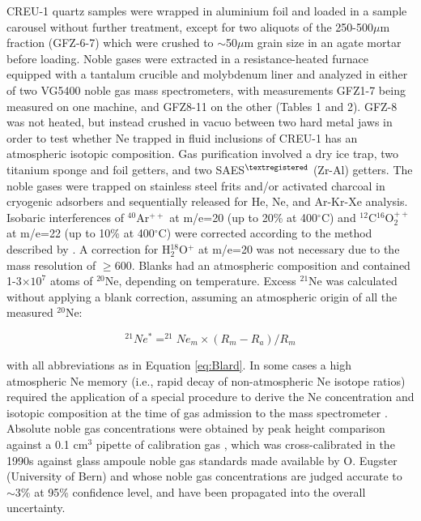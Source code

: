 \documentclass[authoryear,review,12pt]{elsarticle}
\begin{document}
CREU-1 quartz samples were wrapped in aluminium foil and loaded in a
sample carousel without further treatment, except for two aliquots of
the 250-500$\mu$m fraction (GFZ-6-7) which were crushed to
$\sim$50$\mu$m grain size in an agate mortar before loading.  Noble
gases were extracted in a resistance-heated furnace equipped with a
tantalum crucible and molybdenum liner and analyzed in either of two
VG5400 noble gas mass spectrometers, with measurements GFZ1-7 being
measured on one machine, and GFZ8-11 on the other (Tables 1 and 2).
GFZ-8 was not heated, but instead crushed in vacuo between two hard
metal jaws in order to test whether Ne trapped in fluid inclusions of
CREU-1 has an atmospheric isotopic composition.  Gas purification
involved a dry ice trap, two titanium sponge and foil getters, and two
SAES$^{\tiny\textregistered}$ (Zr-Al) getters.  The noble gases were
trapped on stainless steel frits and/or activated charcoal in
cryogenic adsorbers and sequentially released for He, Ne, and Ar-Kr-Xe
analysis. Isobaric interferences of $^{40}$Ar$^{++}$ at m/e=20 (up to
20\% at 400$^{\circ}$C) and $^{12}$C$^{16}$O$_2^{++}$ at m/e=22 (up to
10\% at 400$^\circ$C) were corrected according to the method described
by \citet{niedermann1993, niedermann1997}. A correction for
H$_2^{18}$O$^+$ at m/e=20 was not necessary due to the mass resolution
of $\geq$600.  Blanks had an atmospheric composition and contained
1-3$\times10^{7}$ atoms of $^{20}$Ne, depending on temperature.
Excess $^{21}$Ne was calculated without applying a blank correction,
assuming an atmospheric origin of all the measured $^{20}$Ne:

\begin{equation}
^{21}Ne^* = ^{21}Ne_m \times (R_m - R_a) / R_m
\label{eq:GFZ}
\end{equation}

with all abbreviations as in Equation \ref{eq:Blard}.  In some cases a
high atmospheric Ne memory (i.e., rapid decay of non-atmospheric Ne
isotope ratios) required the application of a special procedure to
derive the Ne concentration and isotopic composition at the time of
gas admission to the mass spectrometer
\citep[see][]{goethals2009b}. Absolute noble gas concentrations were
obtained by peak height comparison against a 0.1 cm$^3$ pipette of
calibration gas \citep[an artificial mixture of the five noble gases
  in nitrogen provided by Linde company;][]{niedermann1997}, which was
cross-calibrated in the 1990s against glass ampoule noble gas
standards made available by O.  Eugster (University of Bern) and whose
noble gas concentrations are judged accurate to $\sim$3\% at 95\%
confidence level, and have been propagated into the overall
uncertainty.
\end{document}
